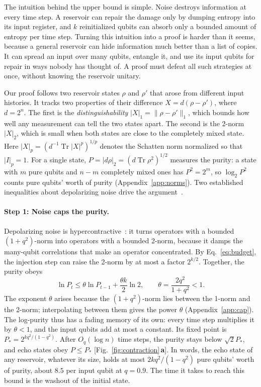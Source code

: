 \documentclass[aps,pra,reprint,superscriptaddress,floatfix]{revtex4-2}
\theoremstyle{plain}
\newcommand{\tr}{\operatorname{Tr}}
\newcommand{\nrm}[2]{\lvert #1\rvert_{#2}}
\newcommand{\Norm}[1]{\lVert #1\rVert}
\newcommand{\pnl}[1]{\textsf{\textbf{#1}}}
\begin{document}
The intuition behind the upper bound is simple. Noise destroys information at every time step. A reservoir can repair the damage only by dumping entropy into its input register, and $k$ reinitialized qubits can absorb only a bounded amount of entropy per time step. Turning this intuition into a proof is harder than it seems, because a general reservoir can hide information much better than a list of copies. It can spread an input over many qubits, entangle it, and use its input qubits for repair in ways nobody has thought of. A proof must defeat all such strategies at once, without knowing the reservoir unitary.

Our proof follows two reservoir states $\rho$ and $\rho'$ that arose from different input histories. It tracks two properties of their difference $X=d(\rho-\rho')$, where $d=2^n$. The first is the \emph{distinguishability} $\nrm X1=\Norm{\rho-\rho'}_1$, which bounds how well any measurement can tell the two states apart. The second is the 2-norm $\nrm X2$, which is small when both states are close to the completely mixed state. Here $\nrm Xp=(d^{-1}\tr|X|^p)^{1/p}$ denotes the Schatten norm normalized so that $\nrm Ip=1$. For a single state, $P=\nrm{d\rho}2=(d\tr\rho^2)^{1/2}$ measures the purity: a state with $m$ pure qubits and $n-m$ completely mixed ones has $P^2=2^m$, so $\log_2P^2$ counts pure qubits' worth of purity (Appendix~\ref{app:norms}). Two established inequalities about depolarizing noise drive the argument~\cite{King2014,Cubitt2015}.

\paragraph*{Step 1: Noise caps the purity.}
Depolarizing noise is hypercontractive~\cite{King2014}: it turns operators with a bounded $(1+q^2)$-norm into operators with a bounded 2-norm, because it damps the many-qubit correlations that make an operator concentrated. By Eq.~\eqref{eq:budget}, the injection step can raise the 2-norm by at most a factor $2^{k/2}$. Together, the purity obeys
\begin{equation}
\ln P_t\le\theta\ln P_{t-1}+\frac{\theta k}2\ln2,\qquad\theta=\frac{2q^2}{1+q^2}<1 .
\label{eq:purity}
\end{equation}
The exponent $\theta$ arises because the $(1+q^2)$-norm lies between the 1-norm and the 2-norm; interpolating between them gives the power $\theta$ (Appendix~\ref{app:cap}). The log-purity thus has a fading memory of its own: every time step multiplies it by $\theta<1$, and the input qubits add at most a constant. Its fixed point is $P_*=2^{kq^2/(1-q^2)}$. After $O_q(\log n)$ time steps, the purity stays below $\sqrt2P_*$, and echo states obey $P\le P_*$ [Fig.~\ref{fig:contraction}\,\pnl{a}]. In words, the echo state of any reservoir, whatever its size, holds at most $2kq^2/(1-q^2)$ pure qubits' worth of purity, about $8.5$ per input qubit at $q=0.9$. The time it takes to reach this bound is the washout of the initial state.
\end{document}
